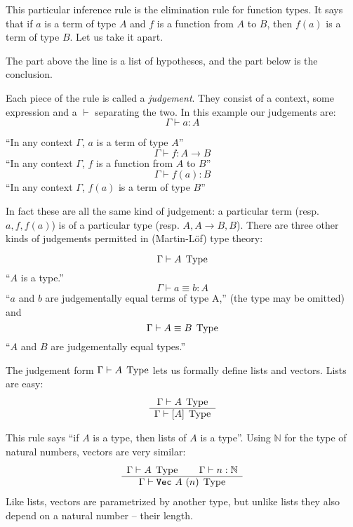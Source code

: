 This particular inference rule is the elimination rule for function types. It
says that if $a$ is a term of type $A$ and $f$ is a function from $A$ to $B$,
then $f(a)$ is a term of type $B$. Let us take it apart.

The part above the line is a list of hypotheses, and the part below is the conclusion.

Each piece of the rule is called a \emph{judgement}. They consist of a
context, some expression and a $\vdash$ separating the two. In this example our judgements are:
\[\Gamma \vdash a : A\]
\begin{center}
``In any context $\Gamma$, $a$ is a term of type $A$''
\[\Gamma \vdash f : A \rightarrow B\]
``In any context $\Gamma$, $f$ is a function from $A$ to $B$''
\[\Gamma \vdash f(a) : B\]
``In any context $\Gamma$, $f(a)$ is a term of type $B$''
\end{center}

In fact these are all the same kind of judgement: a particular term (resp. $a, f,
f(a)$) is of a particular type (resp. $A, A \rightarrow B, B$). There are three
other kinds of judgements permitted in (Martin-Löf) type theory:
\begin{center}
  \[\Gamma \vdash A \; \operatorname{Type}\]
  ``$A$ is a type.''
  \[\Gamma \vdash a \equiv b : A\]
  ``$a$ and $b$ are judgementally equal terms of type A,'' (the type may be omitted) and
  \[\Gamma \vdash A \equiv B \; \operatorname{Type}\]
  ``$A$ and $B$ are judgementally equal types.''
\end{center}

The judgement form $\Gamma \vdash A \; \operatorname{Type}$ lets us formally define lists and
vectors. Lists are easy:
\begin{equation*}
  \begin{array}{c}
    \Gamma \vdash A \; \operatorname{Type} \\
    \hline
    \Gamma \vdash [A] \; \operatorname{Type}
  \end{array}
  \label{rule:lists}
\end{equation*}

This rule says ``if $A$ is a type, then lists of $A$ is a type''. Using
$\mathbb{N}$ for the type of natural numbers, vectors are very similar:
\begin{equation*}
  \begin{array}{c}
    \Gamma \vdash A \; \operatorname{Type} \qquad \Gamma \vdash n : \mathbb{N} \\
    \hline
    \Gamma \vdash \texttt{Vec}~A~(n) \; \operatorname{Type}
  \end{array}
  \label{rule:vectors}
\end{equation*}
Like lists, vectors are parametrized by another type, but unlike lists they also
depend on a natural number -- their length.

